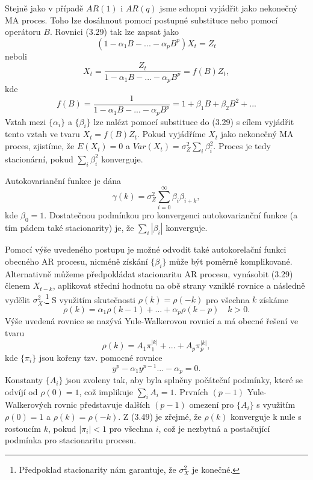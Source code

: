 Stejně jako v případě $AR(1)$ i $AR(q)$ jsme schopni vyjádřit jako nekonečný MA proces. Toho lze dosáhnout pomocí postupné substituce nebo pomocí operátoru $B$. Rovnici (3.29) tak lze zapsat jako
\begin{equation}
(1 - \alpha_1 B - ... - \alpha_p B^p)X_t = Z_t
\end{equation}
neboli
\begin{equation}
X_t = \frac{Z_t}{1 - \alpha_1 B - ... - \alpha_p B^p} = f(B)Z_t,
\end{equation}
kde
\begin{equation}
f(B) = \frac{1}{1 - \alpha_1 B - ... - \alpha_p B^p} = 1 + \beta_1 B + \beta_2 B^2 + ...
\end{equation}
Vztah mezi $\{\alpha_i \}$ a $\{\beta_i \}$ lze nalézt pomocí substituce do (3.29) s cílem vyjádřit tento vztah ve tvaru $X_t = f(B)Z_t$. Pokud vyjádříme $X_t$ jako nekonečný MA proces, zjistíme, že $E(X_t) = 0$ a $Var(X_t) = \sigma_Z^2 \sum_i \beta_i^2$. Proces je tedy stacionární, pokud $\sum_i \beta_i^2$ konverguje.

Autokovarianční funkce je dána
\begin{equation}
\gamma(k) = \sigma_Z^2 \sum_{i = 0}^{\infty} \beta_i \beta_{i + k},
\end{equation}
kde $\beta_0 = 1$. Dostatečnou podmínkou pro konvergenci autokovarianční funkce (a tím pádem také stacionarity) je, že $\sum_i |\beta_i|$ konverguje.

Pomocí výše uvedeného postupu je možné odvodit také autokorelační funkci obecného AR procesu, nicméně získání $\{\beta_i\}$ může být poměrně komplikované. Alternativně můžeme předpokládat stacionaritu AR procesu, vynásobit (3.29) členem $X_{t - k}$, aplikovat střední hodnotu na obě strany vzniklé rovnice a následně vydělit $\sigma_X^2$.\footnote{Předpoklad stacionarity nám garantuje, že $\sigma^2_X$ je konečné.} S využitím skutečnosti $\rho(k) = \rho(-k)$ pro všechna $k$ získáme
\begin{equation}
\rho(k) = \alpha_1 \rho(k - 1) + ... + \alpha_p \rho(k - p) \quad k > 0.
\end{equation}
Výše uvedená rovnice se nazývá Yule-Walkerovou rovnicí a má obecné řešení ve tvaru
\begin{equation}
\rho(k) = A_1 \pi_1^{|k|} + ... + A_p \pi_p^{|k|},
\end{equation}
kde $\{\pi_i\}$ jsou kořeny tzv. pomocné rovnice
\begin{equation}
y^p - \alpha_1 y^{p - 1} ... - \alpha_p = 0.
\end{equation}
Konstanty $\{A_i\}$ jsou zvoleny tak, aby byla splněny počáteční podmínky, které se odvíjí od $\rho(0) = 1$, což implikuje $\sum_i A_i = 1$. Prvních $(p - 1)$ Yule-Walkerových rovnic představuje dalších $(p - 1)$ omezení pro $\{A_i\}$ s využitím $\rho(0) = 1$ a $\rho(k) = \rho(-k)$. Z (3.49) je zřejmé, že $\rho(k)$ konverguje k nule s rostoucím $k$, pokud $|\pi_i| < 1$ pro všechna $i$, což je nezbytná a postačující podmínka pro stacionaritu procesu.

